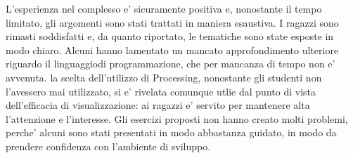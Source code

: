 L'esperienza nel complesso e' sicuramente positiva e, nonostante il tempo limitato, gli argomenti sono stati trattati in maniera esaustiva. I ragazzi sono rimasti soddisfatti e, da quanto riportato, le tematiche sono state esposte in modo chiaro. Alcuni hanno lamentato un mancato approfondimento ulteriore riguardo il linguaggiodi programmazione, che per mancanza di tempo non e' avvenuta. la scelta dell'utilizzo di Processing, nonostante gli studenti non l'avessero mai utilizzato, si e' rivelata comunque utlie dal punto di vista dell'efficacia di visualizzazione: ai ragazzi e' servito per mantenere alta l'attenzione e l'interesse. Gli esercizi proposti non hanno creato molti problemi, perche' alcuni sono stati presentati in modo abbastanza guidato, in modo da prendere confidenza con l'ambiente di sviluppo. 
